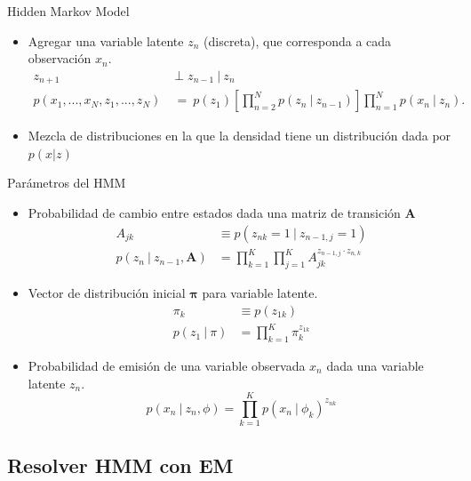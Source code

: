 \documentclass[10pt]{beamer}
\begin{document}
\begin{frame}{Hidden Markov Model}
  \begin{itemize}
    \item Agregar una variable latente $z_n$ (discreta), que corresponda a cada observación $x_n$.
      \begin{align}
        z_{n+1} &\perp z_{n-1} ~|~ z_{n} \\
        p(x_1, ..., x_N, z_1, ..., z_N) &~=~ p(z_1) \left [ \prod_{n=2}^N p(z_n ~|~ z_{n-1}) \right ] 
          \prod_{n=1}^N p(x_n ~|~ z_{n}).
      \end{align}
      
    \item Mezcla de distribuciones en la que la densidad tiene un distribución dada por $p(x | z)$      
  \end{itemize}
\end{frame}

\begin{frame}{Parámetros del HMM}
  \begin{itemize}
    \item Probabilidad de cambio entre estados dada una \alert{matriz de transición} $\mathbf{A}$
      \begin{align}
        A_{jk} &\equiv p(z_{nk} = 1 ~|~  z_{n-1, j} = 1) \\
        p(z_n ~|~ z_{n-1}, \mathbf{A}) &= \prod_{k=1}^K \prod_{j=1}^K A_{jk}^{z_{{n-1}, j} \cdot z_{n,k}}
      \end{align}      
    \item \alert{Vector de distribución inicial} $\bm{\pi}$ para variable latente.
      \begin{align}
        \pi_k &\equiv p(z_{1k}) \\
        p(z_1 ~|~ \pi) &= \prod_{k=1}^K \pi_k^{z_{1k}}
      \end{align}       
    \item \alert{Probabilidad de emisión} de una variable observada $x_n$ dada una variable latente $z_n$.
      \begin{equation}
        p(x_n ~|~ z_n, \phi) = \prod_{k=1}^K p(x_n ~|~ \phi_k) ^ {z_{nk}}
      \end{equation}
  \end{itemize}
\end{frame}

\subsection{Resolver HMM con EM}
\end{document}
